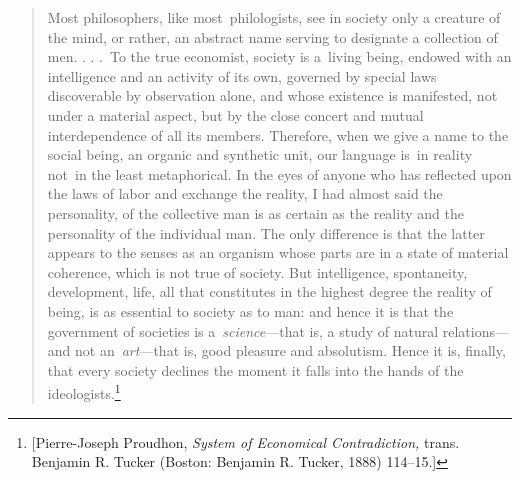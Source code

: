 \documentclass[twoside,symmetric,nobib,justified]{tufte-book}
\begin{document}
\begin{quote}
Most philosophers, like most~philologists, see in society only a
creature of the mind, or rather, an abstract name serving to designate a
collection of men. . . .~To the true economist, society is a~living
being, endowed with an intelligence and an activity of its own, governed
by special laws discoverable by observation alone, and whose existence
is manifested, not under a material aspect, but by the close concert and
mutual interdependence of all its members. Therefore, when we give a
name to the social being, an organic and synthetic unit, our language
is~in reality not~in the least metaphorical. In the eyes of anyone who
has reflected upon the laws of labor and exchange the reality, I had
almost said the personality, of the collective man is as certain as the
reality and the personality of the individual man. The only difference
is that the latter appears to the senses as an organism whose parts are
in a state of material coherence, which is not true of society. But
intelligence, spontaneity, development, life, all that constitutes in
the highest degree the reality of being, is as essential to society as
to man: and hence it is that the government of societies is
a~\emph{science}---that is, a study of natural relations---and not
an~\emph{art}---that is, good pleasure and absolutism. Hence it is,
finally, that every society declines the moment it falls into the hands
of the ideologists.\footnote{{[}Pierre-Joseph Proudhon, \emph{System of
  Economical Contradiction,} trans. Benjamin R. Tucker (Boston: Benjamin
  R. Tucker, 1888) 114--15.{]}}~
\end{quote}
\end{document}
